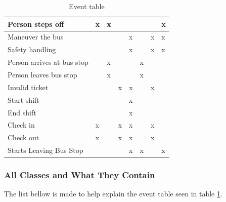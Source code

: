 \begin{table}[H]
{\begin{tabular}{|l|l|l|l|l|l|l|l|}
Person steps off           & x         & x                   &        &            &          &                & x   \\ \hline
Maneuver the bus           &           &                     &        & x          &          & x              & x   \\ \hline
Safety handling            &           &                     &        & x          &          & x              & x   \\ \hline
Person arrives at bus stop &           & x                   &        &            & x        &                &     \\ \hline
Person leaves bus stop     &           & x                   &        &            & x        &                &     \\ \hline
Invalid ticket             &           &                     & x      & x          &          & x              &     \\ \hline
Start shift                &           &                     &        & x          &          &                &     \\ \hline
End shift                  &           &                     &        & x          &          &                &     \\ \hline
Check in                   & x         &                     & x      & x          &          & x              &     \\ \hline
Check out                  & x         &                     & x      & x          &          & x              &     \\ \hline
Starts Leaving Bus Stop            &           &                     &        & x          & x        &                & x   \\ \hline
\end{tabular}%
}
\label{event-table}
\caption{Event table}
\end{table}

\subsubsection{All Classes and What They Contain}

The list bellow is made to help explain the event table seen in table \ref{event-table}.%

